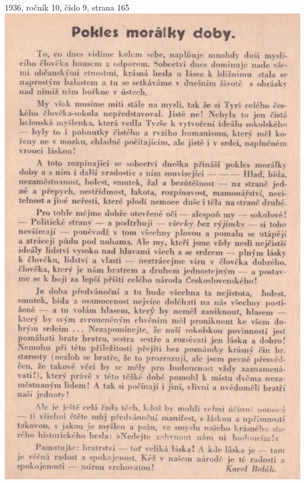 \documentclass[11pt]{article}
\begin{document}
1936, ročník 10, číslo 9, strana 165 \\
\includegraphics[width=\imagewidth]{original/1936/Skener_20250323 (6).jpg}
\end{document}
